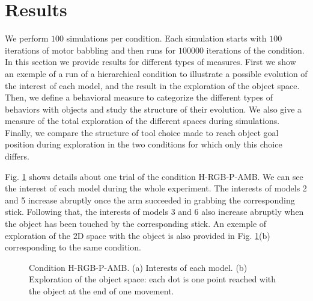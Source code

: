 \documentclass[10pt,letterpaper]{article}
\begin{document}
	
%


\section{Results}
	
	We perform $100$ simulations per condition. 
	Each simulation starts with $100$ iterations of motor babbling and then runs for $100000$ iterations of the condition.
	In this section we provide results for different types of measures. 
	First we show an exemple of a run of a hierarchical condition to illustrate a possible evolution of the interest of each model, and the result in the exploration of the object space.
	Then, we define a behavioral measure to categorize the different types of behaviors with objects and study the structure of their evolution.
	We also give a measure of the total exploration of the different spaces during simulations.
	Finally, we compare the structure of tool choice made to reach object goal position during exploration in the two conditions for which only this choice differs.
		
	Fig. \ref{res_interests} shows details about one trial of the condition H-RGB-P-AMB. 
	We can see the interest of each model during the whole experiment.
	The interests of models 2 and 5 increase abruptly once the arm succeeded in grabbing the corresponding stick.
	Following that, the interests of models 3 and 6 also increase abruptly when the object has been touched by the corresponding stick.
	An exemple of exploration of the $2$D space with the object is also provided in Fig. \ref{res_interests}(b) corresponding to the same condition.
	
	\begin{figure}[ht]
		\centering
		\caption{Condition H-RGB-P-AMB. (a) Interests of each model. (b) Exploration of the object space: each dot is one point reached with the object at the end of one movement.}
		\label{res_interests}
	\end{figure}
\end{document}
